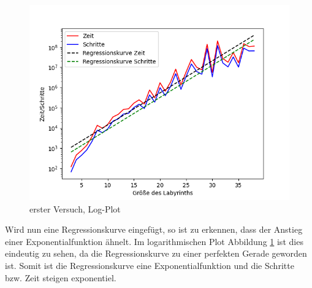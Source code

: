 \documentclass[12pt, a4paper, titlepage]{article}
\begin{document}
\begin{figure}[t]
	\centering
	\includegraphics[scale=.5]{v1AusLog.png}
	\caption{erster Versuch, Log-Plot}
	\label{fig:Plot v1Log}
\end{figure}

Wird nun eine Regressionskurve eingefügt, so ist zu erkennen, dass der Anstieg einer Exponentialfunktion ähnelt.
Im logarithmischen Plot Abbildung \ref{fig:Plot v1Log} ist dies eindeutig zu sehen, da die Regressionskurve zu einer perfekten Gerade geworden ist.
Somit ist die Regressionskurve eine Exponentialfunktion und die Schritte bzw. Zeit steigen exponentiel.
\end{document}
